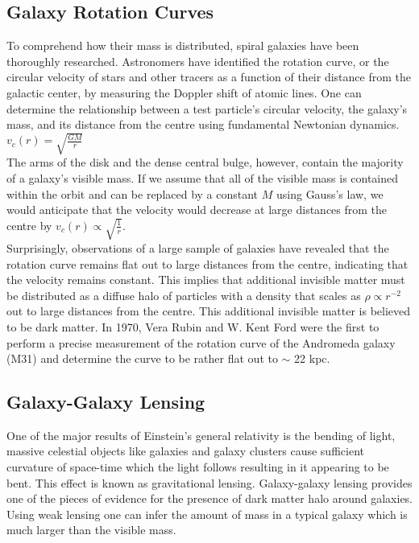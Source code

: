 \subsection{Galaxy Rotation Curves}
\hspace{0.5cm}To comprehend how their mass is distributed, spiral galaxies have been thoroughly researched. Astronomers have identified the rotation curve, or the circular velocity of stars and other tracers as a function of their distance from the galactic center, by measuring the Doppler shift of atomic lines. One can determine the relationship between a test particle's circular velocity, the galaxy's mass, and its distance from the centre using fundamental Newtonian dynamics.$v_{c} (r) = \sqrt{\frac{GM}{r}}$\\

\hspace{0.5cm}The arms of the disk and the dense central bulge, however, contain the majority of a galaxy's visible mass. If we assume that all of the visible mass is contained within the orbit and can be replaced by a constant $M$ using Gauss's law, we would anticipate that the velocity would decrease at large distances from the centre by  $v_{c} (r) \propto \sqrt{\frac{1}{r}} $.\\

\hspace{0.5cm}Surprisingly, observations of a large sample of galaxies have revealed that the rotation curve remains flat out to large distances from the centre, indicating that the velocity remains constant. This implies that additional invisible matter must be distributed as a diffuse halo of particles with a density that scales as $\rho \propto r^{-2}$ out to large distances from the centre. This additional invisible matter is believed to be dark matter. In 1970, Vera Rubin and W. Kent Ford \cite{Rubin:1970zza} were the first to perform a precise measurement of the rotation curve of the Andromeda galaxy (M31) and determine the curve to be rather flat out to $\sim$ 22 kpc.


\subsection{Galaxy-Galaxy Lensing}
\hspace{0.5cm}One of the major results of Einstein's general relativity is the bending of light, massive celestial objects like galaxies and galaxy clusters cause sufficient curvature of space-time which the light follows resulting in it appearing to be bent. This effect is known as gravitational lensing. Galaxy-galaxy lensing provides one of the pieces of evidence for the presence of dark matter halo around galaxies. Using weak lensing one can infer the amount of mass in a typical galaxy which is much larger than the visible mass. 

